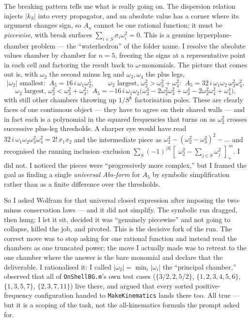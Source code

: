 \documentclass{article}
\newcommand{\pp}[1]{\left[\,#1\,\right]_{+}}
\begin{document}
The breaking pattern tells me what is really going on. The dispersion relation
injects $|k_S|$ into every propagator, and an absolute value has a corner where
its argument changes sign, so $A_n$ cannot be one rational function; it must be
\emph{piecewise}, with break surfaces $\sum_{i\in S}\sigma_i\omega_i^2=0$. This is
a genuine hyperplane-chamber problem --- the ``waterhedron'' of the folder name.
I resolve the absolute values chamber by chamber for $n=5$, freezing the signs at
a representative point in each cell and factoring the result back to
$\omega$-monomials. The picture that comes out is, with $\omega_2$ the second
minus leg and $\omega_3,\omega_4$ the plus legs,
\[
\text{$|\omega_2|$ smallest:}\;\; A_5=16\,i\,\omega_1\omega_2^{5},\qquad
\text{$\omega_2$ largest, $\omega_2^2>\omega_3^2{+}\omega_4^2$:}\;\;
A_5=32\,i\,\omega_1\omega_2\,\omega_3^{2}\omega_4^{2},
\]
\[
\text{$\omega_2$ largest, $\omega_2^2<\omega_3^2{+}\omega_4^2$:}\;\;
A_5=-16\,i\,\omega_1\omega_2\big(\omega_2^{4}-2\omega_2^{2}\omega_3^{2}+\omega_3^{4}
-2\omega_2^{2}\omega_4^{2}+\omega_4^{4}\big),
\]
with still other chambers throwing up $1/S^k$ factorisation poles. These are
clearly faces of one continuous object --- they have to agree on their shared
walls --- and in fact each is a polynomial in the squared frequencies that turns
on as $\omega_2^2$ crosses successive plus-leg thresholds. A sharper eye would
have read $32\,i\,\omega_1\omega_2\omega_3^2\omega_4^2 = 2!\,x_1x_2$ and the
intermediate piece as $\omega_2^4-(\omega_2^2-\omega_3^2)^2-\dots$ and recognised
the running inclusion--exclusion $\sum_S(-1)^{|S|}\pp{\,\omega_2^2-\sum_{j\in S}\omega_j^2\,}^{\,m}$.
I did not. I noticed the pieces were ``progressively more complex,'' but I framed
the goal as finding a single \emph{universal Abs-form} for $A_5$ by symbolic
simplification rather than as a finite difference over the thresholds.

So I asked Wolfram for that universal closed expression after imposing the
two-minus conservation laws --- and it did not simplify. The symbolic run dragged,
then hung; I let it sit, decided it was ``genuinely piecewise'' and not going to
collapse, killed the job, and pivoted. This is the decisive fork of the run. The
correct move was to stop asking for one rational function and instead read the
chambers as one truncated power; the move I actually made was to retreat to the
one chamber where the answer is the bare monomial and declare that the
deliverable. I rationalised it: I called $|\omega_2|=\min_i|\omega_i|$ the
``principal chamber,'' observed that all of \texttt{OnShellBG.m}'s own test cases
($\{3/2,2,5/2\}$, $\{1,2,3,4,5,6\}$, $\{1,3,5,7\}$, $\{2,3,7,11\}$) live there,
and argued that every sorted positive-frequency configuration handed to
\texttt{MakeKinematics} lands there too. All true --- but it is a scoping of the
task, not the all-kinematics formula the prompt asked for.
\end{document}
